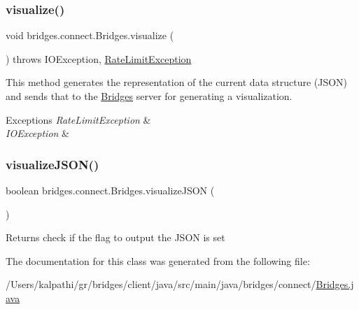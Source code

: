 \subsubsection{\texorpdfstring{visualize()}{visualize()}}
{\footnotesize\ttfamily void bridges.\+connect.\+Bridges.\+visualize (\begin{DoxyParamCaption}{ }\end{DoxyParamCaption}) throws I\+O\+Exception, \mbox{\hyperlink{classbridges_1_1validation_1_1_rate_limit_exception}{Rate\+Limit\+Exception}}}

This method generates the representation of the current data structure (J\+S\+ON) and sends that to the \mbox{\hyperlink{classbridges_1_1connect_1_1_bridges}{Bridges}} server for generating a visualization.


\begin{DoxyExceptions}{Exceptions}
{\em Rate\+Limit\+Exception} & \\
\hline
{\em I\+O\+Exception} & \\
\hline
\end{DoxyExceptions}
\mbox{\label{classbridges_1_1connect_1_1_bridges_afd3c63780396e92c94c923037385b31d}} 
\subsubsection{\texorpdfstring{visualize\+J\+S\+O\+N()}{visualizeJSON()}}
{\footnotesize\ttfamily boolean bridges.\+connect.\+Bridges.\+visualize\+J\+S\+ON (\begin{DoxyParamCaption}{ }\end{DoxyParamCaption})}

\begin{DoxyReturn}{Returns}
check if the flag to output the J\+S\+ON is set 
\end{DoxyReturn}


The documentation for this class was generated from the following file\+:\begin{DoxyCompactItemize}
\item 
/\+Users/kalpathi/gr/bridges/client/java/src/main/java/bridges/connect/\mbox{\hyperlink{_bridges_8java}{Bridges.\+java}}\end{DoxyCompactItemize}

